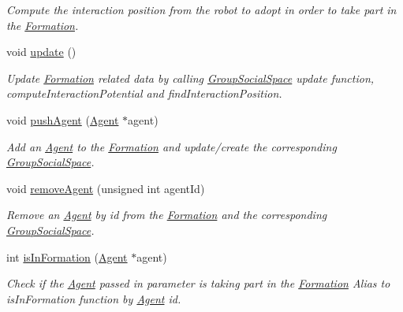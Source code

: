 \begin{DoxyCompactItemize}
\begin{DoxyCompactList}\small\item\em Compute the interaction position from the robot to adopt in order to take part in the \hyperlink{classFormation}{Formation}. \end{DoxyCompactList}\item 
void \hyperlink{classFormation_a0d340a1151f9bbcf85082da48adddd58}{update} ()\hypertarget{classFormation_a0d340a1151f9bbcf85082da48adddd58}{}\label{classFormation_a0d340a1151f9bbcf85082da48adddd58}

\begin{DoxyCompactList}\small\item\em Update \hyperlink{classFormation}{Formation} related data by calling \hyperlink{classGroupSocialSpace}{Group\+Social\+Space} update function, compute\+Interaction\+Potential and find\+Interaction\+Position. \end{DoxyCompactList}\item 
void \hyperlink{classFormation_a76796be1ec2e264b90011139bfb0347b}{push\+Agent} (\hyperlink{classAgent}{Agent} $\ast$agent)
\begin{DoxyCompactList}\small\item\em Add an \hyperlink{classAgent}{Agent} to the \hyperlink{classFormation}{Formation} and update/create the corresponding \hyperlink{classGroupSocialSpace}{Group\+Social\+Space}. \end{DoxyCompactList}\item 
void \hyperlink{classFormation_acabd4b08ca629208eca4db572360a0ab}{remove\+Agent} (unsigned int agent\+Id)
\begin{DoxyCompactList}\small\item\em Remove an \hyperlink{classAgent}{Agent} by id from the \hyperlink{classFormation}{Formation} and the corresponding \hyperlink{classGroupSocialSpace}{Group\+Social\+Space}. \end{DoxyCompactList}\item 
int \hyperlink{classFormation_a20c4f00445b98ddf0f70ffeca020dba4}{is\+In\+Formation} (\hyperlink{classAgent}{Agent} $\ast$agent)
\begin{DoxyCompactList}\small\item\em Check if the \hyperlink{classAgent}{Agent} passed in parameter is taking part in the \hyperlink{classFormation}{Formation} Alias to is\+In\+Formation function by \hyperlink{classAgent}{Agent} id. \end{DoxyCompactList}\item 

\end{DoxyCompactItemize}
